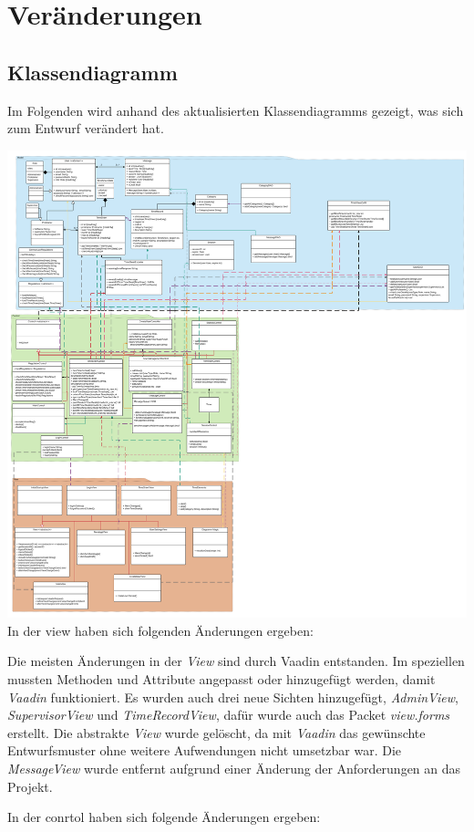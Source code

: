 \section{Veränderungen}
\subsection{Klassendiagramm}
Im Folgenden wird anhand des aktualisierten Klassendiagramms gezeigt, was sich zum Entwurf verändert hat.

\includegraphics{Class-Diagramm_alt.pdf}
In der view haben sich folgenden Änderungen ergeben:

Die meisten Änderungen in der \emph{View} sind durch Vaadin entstanden. 
Im speziellen mussten Methoden und Attribute angepasst oder hinzugefügt werden, 
damit \emph{Vaadin} funktioniert.
Es wurden auch drei neue Sichten hinzugefügt, \emph{AdminView}, \emph{SupervisorView} und \emph{TimeRecordView}, 
dafür wurde auch das Packet \emph{view.forms} erstellt.
Die abstrakte \emph{View} wurde gelöscht, da mit \emph{Vaadin} das gewünschte Entwurfsmuster 
ohne weitere Aufwendungen nicht umsetzbar war.
Die \emph{MessageView} wurde entfernt aufgrund einer Änderung der Anforderungen an das Projekt.

In der conrtol haben sich folgende Änderungen ergeben:

